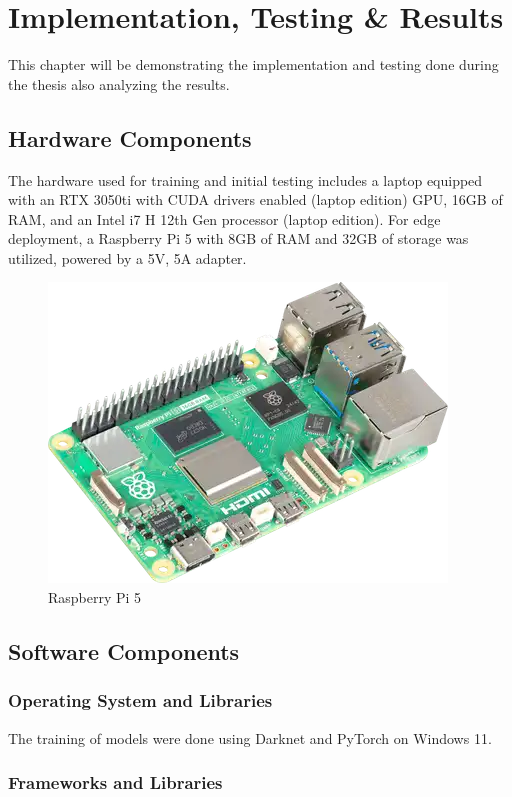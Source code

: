\chapter{Implementation, Testing \& Results}

This chapter will be demonstrating the implementation and testing done during the thesis also analyzing the results.


\section{Hardware Components}

The hardware used for training and initial testing includes a laptop equipped with an RTX 3050ti with CUDA drivers enabled (laptop edition) GPU, 16GB of RAM, and an Intel i7 H 12th Gen processor (laptop edition). For edge deployment, a Raspberry Pi 5 with 8GB of RAM and 32GB of storage was utilized, powered by a 5V, 5A adapter.

\begin{figure}[h]
    \centering
    \includegraphics[width=0.5\linewidth]{figures/ezgif-6-b7521061ad.png}
    \caption{Raspberry Pi 5}
    \label{fig:rpi5}
\end{figure}

\section{Software Components}

\subsection{Operating System and Libraries}

The training of models were done using Darknet and PyTorch on Windows 11.

\subsection{Frameworks and Libraries}

